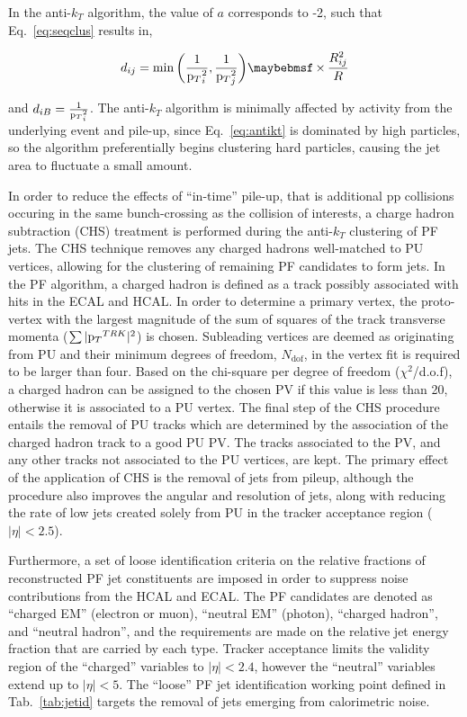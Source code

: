 In the anti-$k_{T}$ algorithm, the value of $a$ corresponds to -2, such that Eq.~\ref{eq:seqclus} results in,

\begin{equation}
  d_{ij} = \min\bigg(\frac{1}{\pt_{i}^{2}},\frac{1}{\pt_{j}^{2}}\bigg)\times\frac{R_{ij}^{2}}{R}
  \label{eq:antikt}
\end{equation}

and $d_{iB}=\frac{1}{{\mathrm p_{T}}_{i}^{2}}$. The anti-$k_{T}$ algorithm is minimally affected by activity from the underlying event and pile-up, since Eq.~\ref{eq:antikt} is dominated by high \pt particles, so the algorithm preferentially begins clustering hard particles, causing the jet area to fluctuate a small amount.

In order to reduce the effects of ``in-time'' pile-up, that is additional pp collisions occuring in the same bunch-crossing as the collision of interests, a charge hadron subtraction (CHS) treatment is performed during the anti-$k_{T}$ clustering of PF jets. The CHS technique removes any charged hadrons well-matched to PU vertices, allowing for the clustering of remaining PF candidates to form jets. In the PF algorithm, a charged hadron is defined as a track possibly associated with hits in the ECAL and HCAL. In order to determine a primary vertex, the proto-vertex with the largest magnitude of the sum of squares of the track transverse momenta \Big($\sum{|\pt^{TRK}|^2}$\Big) is chosen. Subleading vertices are deemed as originating from PU and their minimum degrees of freedom, $N_{\mathrm{dof}}$, in the vertex fit is required to be larger than four. Based on the chi-square per degree of freedom ($\chi^2$/d.o.f), a charged hadron can be assigned to the chosen PV if this value is less than 20, otherwise it is associated to a PU vertex. The final step of the CHS procedure entails the removal of PU tracks which are determined by the association of the charged hadron track to a good PU PV. The tracks associated to the PV, and any other tracks not associated to the PU vertices, are kept. The primary effect of the application of CHS is the removal of jets from pileup, although the procedure also improves the angular and \pt resolution of jets, along with reducing the rate of low \pt jets created solely from PU in the tracker acceptance region ($|\eta|<2.5$).

Furthermore, a set of loose identification criteria on the relative fractions of reconstructed PF jet constituents are imposed in order to suppress noise contributions from the HCAL and ECAL. The PF candidates are denoted as ``charged EM'' (electron or muon), ``neutral EM'' (photon), ``charged hadron'', and ``neutral hadron'', and the requirements are made on the relative jet energy fraction that are carried by each type. Tracker acceptance limits the validity region of the ``charged'' variables to $|\eta|<2.4$, however the ``neutral'' variables extend up to $|\eta|<5$. The ``loose'' PF jet identification working point defined in Tab.~\ref{tab:jetid} targets the removal of jets emerging from calorimetric noise.

